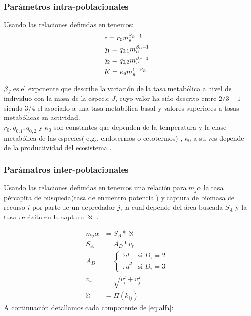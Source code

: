 \subsubsection{Par\'ametros intra-poblacionales}
Usando las relaciones definidas en \cite{savage2004effects} tenemos:
\begin{equation}\label{eq:params3}
\begin{aligned}
&r = r_0m_{\textit{\tiny R}}^{\beta_{\textit{\tiny R}} - 1} \\
&q_1=q_{0,1}m_{\textit{\tiny C}}^{\beta_{\textit{\tiny C}} - 1} \\
&q_2= q_{0,2}m_{\textit{\tiny P}}^{\beta_{\textit{\tiny P}} -1}\\
&K= \kappa_{0}m_{\textit{\tiny R}}^{1-\beta_{\textit{\tiny R}}}
\end{aligned}
\end{equation}

$\beta_J$ es el exponente que describe la variaci\'on de la tasa metab\'olica a nivel de individuo con la masa de la especie $J$, cuyo valor ha sido descrito entre $2/3 - 1$ siendo $3/4$ el asociado a una tasa metab\'olica basal y valores superiores a tasas metab\'olicas en actividad\citep{pawar2012dimensionality,west1997general,savage2004predominance}. \\
$r_0,q_{0,1},q_{0,2}$ y $\kappa_0$ son constantes que dependen de la temperatura y la clase metab\'olica de las especies( e.g., endotermos o ectotermos) , $\kappa_0$ a su ves depende de la productividad del ecosistema \citep{pawar2012dimensionality}.
\subsubsection{Par\'amatros inter-poblacionales}
Usando las relaciones definidas en \citep{pawar2012dimensionality,kiltie2000scaling,mcgill2006allometric,bejan2006unifying} tenemos una relaci\'on para $m_j\alpha$  la tasa p\'ercapita de b\'usqueda(tasa de encuentro potencial) y captura de biomasa de recurso $i$ por parte de un depredador $j$, la cual depende del \'area buscada $S_A$ y la tasa de \'exito en la captura $\aleph$ : 

\begin{equation}\label{eq:alfa}
\begin{aligned}
 m_j\alpha & =  S_A*\aleph \\
 S_A &=  A_D * v_r \\
A_D &=  \begin{cases} 2d & \text{si } D_i = 2 \\ \pi d^2 & \text{si } D_i = 3 \end{cases}\\
v_r &= \sqrt{v_i^2 +v_j^2}\\
\aleph &= \Pi(k_{ij})
\end{aligned}
\end{equation}
A continuaci\'on detallamos cada componente de \eqref{eq:alfa}:\\

